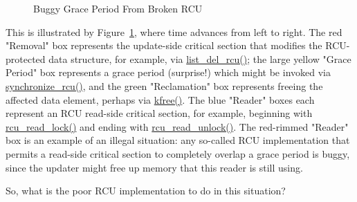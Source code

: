 \begin{figure}[htb]
\begin{center}
\end{center}
\caption{Buggy Grace Period From Broken RCU}
\label{app:rcuimpl:Buggy Grace Period From Broken RCU}
\end{figure}

This is illustrated by
Figure~\ref{app:rcuimpl:Buggy Grace Period From Broken RCU},
where time advances from left to right.
The red "Removal" box represents the update-side critical section that
modifies the RCU-protected data structure, for example, via
\url{list_del_rcu()}; the large yellow "Grace Period" box
represents a grace period (surprise!) which might be invoked via
\url{synchronize_rcu()}, and the green "Reclamation" box
represents freeing the affected data element,
perhaps via \url{kfree()}.
The blue "Reader" boxes each represent an RCU read-side critical section,
for example, beginning with \url{rcu_read_lock()} and ending with
\url{rcu_read_unlock()}.
The red-rimmed "Reader" box is an example of an illegal situation:
any so-called RCU implementation that permits a read-side critical section
to completely overlap a grace period is buggy, since the updater might
free up memory that this reader is still using.

So, what is the poor RCU implementation to do in this situation?

